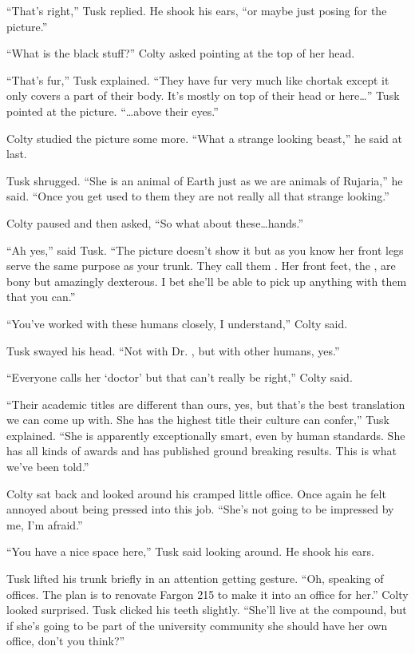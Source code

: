 ``That's right,'' Tusk replied. He shook his ears, ``or maybe just posing for the picture.''

``What is the black stuff?'' Colty asked pointing at the top of her head.

``That's fur,'' Tusk explained. ``They have fur very much like chortak except it only covers a
part of their body. It's mostly on top of their head or here\ldots'' Tusk pointed at the
picture. ``\ldots above their eyes.''

Colty studied the picture some more. ``What a strange looking beast,'' he said at last.

Tusk shrugged. ``She is an animal of Earth just as we are animals of Rujaria,'' he said. ``Once
you get used to them they are not really all that strange looking.''

Colty paused and then asked, ``So what about these\ldots hands.''

``Ah yes,'' said Tusk. ``The picture doesn't show it but as you know her front legs serve the
same purpose as your trunk. They call them . Her front feet, the , are
bony but amazingly dexterous. I bet she'll be able to pick up anything with them that you can.''

``You've worked with these humans closely, I understand,'' Colty said.

Tusk swayed his head. ``Not with Dr. , but with other humans, yes.''

``Everyone calls her `doctor' but that can't really be right,'' Colty said.

``Their academic titles are different than ours, yes, but that's the best translation we can
come up with. She has the highest title their culture can confer,'' Tusk explained. ``She is
apparently exceptionally smart, even by human standards. She has all kinds of awards and has
published ground breaking results. This is what we've been told.''

Colty sat back and looked around his cramped little office. Once again he felt annoyed about
being pressed into this job. ``She's not going to be impressed by me, I'm afraid.''

``You have a nice space here,'' Tusk said looking around. He shook his ears.

Tusk lifted his trunk briefly in an attention getting gesture. ``Oh, speaking of offices. The
plan is to renovate Fargon 215 to make it into an office for her.'' Colty looked surprised. Tusk
clicked his teeth slightly. ``She'll live at the compound, but if she's going to be part of the
university community she should have her own office, don't you think?''

